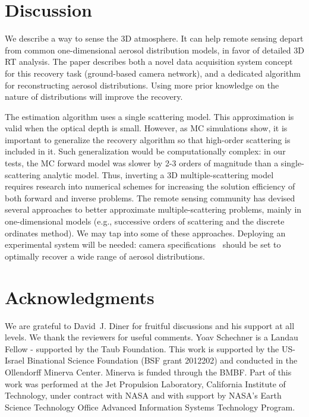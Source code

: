 \documentclass[10pt,letterpaper]{article}
\newcommand{\del}[1]{\sout{#1}}
\newcommand{\rl}[1]{\uwave{#1}}
\newcommand{\fix}[2]{\del{#1}\rl{#2}}
\begin{document}

\section{Discussion}
\label{sec:conclusions}

We describe a way to sense the 3D atmosphere. It can help remote
sensing depart from common one-dimensional aerosol distribution models, in favor
of detailed 3D RT analysis.  The paper describes both a novel data
acquisition system concept for this recovery task (ground-based camera
network), and a dedicated algorithm for reconstructing aerosol
distributions. Using more prior knowledge on the nature of
distributions will improve the recovery.

The estimation algorithm
uses a single scattering model. This approximation is valid when the
optical depth is small. However, as MC simulations show, it is
important to generalize the recovery algorithm so that high-order scattering
is included in it. Such generalization would be computationally complex:
in our tests, the MC forward model was slower by 2-3 orders of magnitude
than a single-scattering analytic model. Thus, inverting a 3D multiple-scattering
model requires research into numerical schemes for increasing the solution
efficiency of both forward and inverse problems.
The remote sensing community has devised several approaches to better approximate
multiple-scattering problems, mainly in one-dimensional models (e.g., successive
orders of scattering and the discrete ordinates method). We may tap into some of these approaches.
Deploying an experimental system will be needed: camera specifications~\cite{Pust2011}
should be set to optimally recover a wide range of aerosol distributions.


\section*{Acknowledgments}
\label{sec:acknowledgments}


We are grateful to David~J. Diner for fruitful discussions and his support at all
levels. We thank the reviewers for useful comments. Yoav Schechner is a Landau
Fellow - supported by the Taub Foundation. This work is supported by the
US-Israel Binational Science Foundation (BSF grant 2012202) and conducted in the
Ollendorff Minerva Center. Minerva is funded through the BMBF. Part of this work
was performed at the Jet Propulsion Laboratory, California Institute of Technology,
under contract with NASA and with support by NASA's Earth Science Technology Office
Advanced Information Systems Technology Program. 
\end{document}
